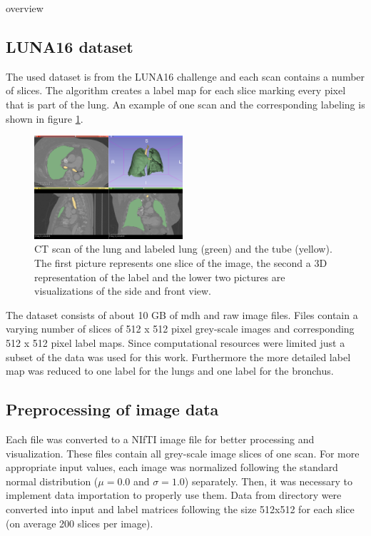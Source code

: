
overview

\subsection{LUNA16 dataset}

The used dataset is from the LUNA16 challenge and each scan contains a number of slices. The algorithm creates a label map for each slice marking every pixel that is part of the lung. An example of one scan and the corresponding labeling is shown in figure \ref{scan_picture}.

\begin{figure}[h!]
	\includegraphics[width=0.49\textwidth, angle=0]{files/Fulllayoutprediction.png}
	\caption{CT scan of the lung and labeled lung (green) and the tube (yellow). The first picture represents one slice of the image, the second a 3D representation of the label and the lower two pictures are visualizations of the side and front view.}
	\label{scan_picture}
\end{figure}

The dataset consists of about 10 GB of mdh and raw image files. Files contain a varying number of slices of 512 x 512 pixel grey-scale images and corresponding 512 x 512 pixel label maps. Since computational resources were limited just a subset of the data was used for this work. Furthermore the more detailed label map was reduced to one label for the lungs and one label for the bronchus.

\subsection{Preprocessing of image data}
Each file was converted to a NIfTI image file for better processing and visualization. These files contain all grey-scale image slices of one scan. For more appropriate input values, each image was normalized following the standard normal distribution ($\mu = 0.0$ and $\sigma = 1.0$) separately. \newline
Then, it was necessary to implement data importation to properly use them. Data from directory were converted into input and label matrices following the size 512x512 for each slice (on average 200 slices per image).

